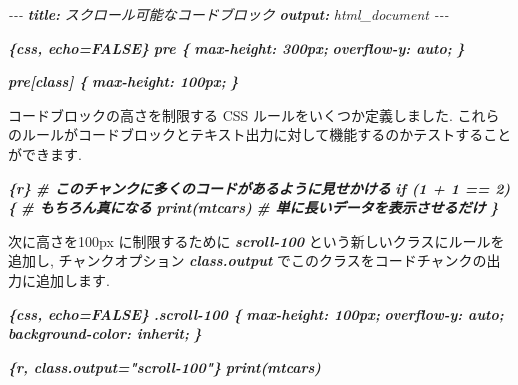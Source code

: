 \documentclass[
  11pt,
]{bxjsreport}
\newenvironment{Shaded}{\begin{snugshade}}{\end{snugshade}}
\newcommand{\AnnotationTok}[1]{\textcolor[rgb]{0.56,0.35,0.01}{\textbf{\textit{#1}}}}
\newcommand{\CommentTok}[1]{\textcolor[rgb]{0.56,0.35,0.01}{\textit{#1}}}
\newcommand{\InformationTok}[1]{\textcolor[rgb]{0.56,0.35,0.01}{\textbf{\textit{#1}}}}
\newcommand{\NormalTok}[1]{#1}
\begin{document}
\begin{Shaded}
\begin{Highlighting}[]
\CommentTok{{-}{-}{-}}
\AnnotationTok{title:}\CommentTok{ スクロール可能なコードブロック}
\AnnotationTok{output:}\CommentTok{ html\_document}
\CommentTok{{-}{-}{-}}

\InformationTok{\textasciigrave{}\textasciigrave{}\textasciigrave{}\{css, echo=FALSE\}}
\InformationTok{pre \{}
\InformationTok{  max{-}height: 300px;}
\InformationTok{  overflow{-}y: auto;}
\InformationTok{\}}

\InformationTok{pre[class] \{}
\InformationTok{  max{-}height: 100px;}
\InformationTok{\}}
\InformationTok{\textasciigrave{}\textasciigrave{}\textasciigrave{}}

\NormalTok{コードブロックの高さを制限する CSS ルールをいくつか定義しました. これらのルールがコードブロックとテキスト出力に対して機能するのかテストすることができます.}

\InformationTok{\textasciigrave{}\textasciigrave{}\textasciigrave{}\{r\}}
\InformationTok{\# このチャンクに多くのコードがあるように見せかける}
\InformationTok{if (1 + 1 == 2) \{}
\InformationTok{  \# もちろん真になる}
\InformationTok{  print(mtcars)}
\InformationTok{  \# 単に長いデータを表示させるだけ}
\InformationTok{\}}
\InformationTok{\textasciigrave{}\textasciigrave{}\textasciigrave{}}

\NormalTok{次に高さを100px に制限するために }\InformationTok{\textasciigrave{}scroll{-}100\textasciigrave{}}\NormalTok{ という新しいクラスにルールを追加し,  チャンクオプション }\InformationTok{\textasciigrave{}class.output\textasciigrave{}}\NormalTok{ でこのクラスをコードチャンクの出力に追加します.}

\InformationTok{\textasciigrave{}\textasciigrave{}\textasciigrave{}\{css, echo=FALSE\}}
\InformationTok{.scroll{-}100 \{}
\InformationTok{  max{-}height: 100px;}
\InformationTok{  overflow{-}y: auto;}
\InformationTok{  background{-}color: inherit;}
\InformationTok{\}}
\InformationTok{\textasciigrave{}\textasciigrave{}\textasciigrave{}}

\InformationTok{\textasciigrave{}\textasciigrave{}\textasciigrave{}\{r, class.output="scroll{-}100"\}}
\InformationTok{print(mtcars)}
\InformationTok{\textasciigrave{}\textasciigrave{}\textasciigrave{}}
\end{Highlighting}
\end{Shaded}
\end{document}
